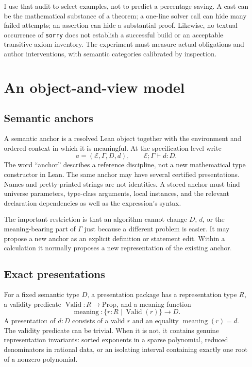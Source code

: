\documentclass[11pt,a4paper]{article}
\newcommand{\code}[1]{\nolinkurl{#1}}
\theoremstyle{definition}
\begin{document}
I use that audit to select examples, not to predict a percentage saving. A cast
can be the mathematical substance of a theorem; a one-line solver call can hide
many failed attempts; an assertion can hide a substantial proof. Likewise, no
textual occurrence of \code{sorry} does not establish a successful build or an
acceptable transitive axiom inventory. The experiment must measure actual
obligations and author interventions, with semantic categories calibrated by
inspection.

\section{An object-and-view model}\label{sec:objects}
\subsection{Semantic anchors}
A semantic anchor is a resolved Lean object together with the environment and
ordered context in which it is meaningful. At the specification level write
\[
 a=(\mathcal E,\Gamma,D,d),\qquad \mathcal E;\Gamma\vdash d:D.
\]
The word ``anchor'' describes a reference discipline, not a new mathematical type
constructor in Lean. The same anchor may have several certified presentations.
Names and pretty-printed strings are not identities. A stored anchor must bind
universe parameters, type-class arguments, local instances, and the relevant
declaration dependencies as well as the expression's syntax.

The important restriction is that an algorithm cannot change \(D\), \(d\), or the
meaning-bearing part of \(\Gamma\) just because a different problem is easier.
It may propose a new anchor as an explicit definition or statement edit. Within
a calculation it normally proposes a new representation of the existing anchor.

\subsection{Exact presentations}
For a fixed semantic type \(D\), a presentation package has a representation type
\(R\), a validity predicate \(\operatorname{Valid}:R\to\mathrm{Prop}\), and a
meaning function
\[
 \operatorname{meaning}:\{r:R\mid\operatorname{Valid}(r)\}\longrightarrow D.
\]
A presentation of \(d:D\) consists of a valid \(r\) and an equality
\(\operatorname{meaning}(r)=d\). The validity predicate can be trivial. When it
is not, it contains genuine representation invariants: sorted exponents in a
sparse polynomial, reduced denominators in rational data, or an isolating interval
containing exactly one root of a nonzero polynomial.
\end{document}
